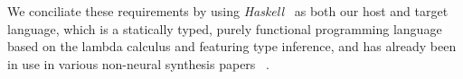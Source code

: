 \documentclass{article}
\begin{document}


We conciliate these requirements
by using \emph{Haskell}~\citep{jones2003haskell} as both our host and target language,
which is a statically typed, purely functional programming language based on the lambda calculus and featuring type inference,
and has already been in use in various non-neural synthesis papers%
~\citep{synquid,hornclauses,scythe,gissurarson2018suggesting}.%

\end{document}
